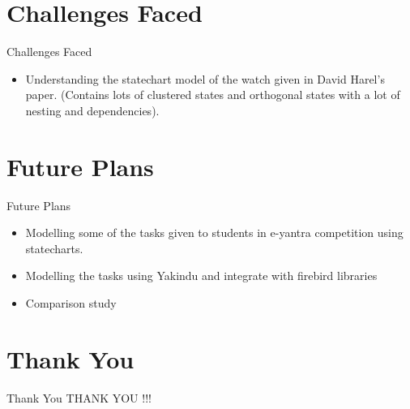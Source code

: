 \documentclass[10pt, a4paper]{beamer}
\begin{document}
\section{Challenges Faced}
\begin{frame}{Challenges Faced}
	\begin{itemize}
		\item Understanding the statechart model of the watch given in David Harel's paper. (Contains lots of clustered states and orthogonal states with a lot of nesting and dependencies). 
	\end{itemize}
\end{frame}

\section{Future Plans}
\begin{frame}{Future Plans}
	\begin{itemize}
		\item Modelling some of the tasks given to students in e-yantra
		competition using statecharts.
		\item Modelling the tasks using Yakindu and integrate with
		firebird libraries
		\item Comparison study
	\end{itemize}
\end{frame}


\section{Thank You}
\begin{frame}{Thank You}
	\centering THANK YOU !!!
\end{frame}
\end{document}
